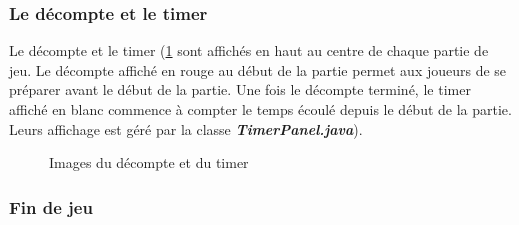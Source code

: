 \subsubsection*{Le décompte et le timer}

Le décompte et le timer (\ref{fig:CountdownAndTimer} sont affichés en haut au centre de chaque partie de jeu. Le décompte affiché en rouge au début de la partie permet aux joueurs de se préparer avant le début de la partie. Une fois le décompte terminé, le timer affiché en blanc commence à compter le temps écoulé depuis le début de la partie. Leurs affichage est géré par la classe \textbf{\textit{TimerPanel.java}}).

\begin{figure}[!htb]%
    \centering
    \qquad
    \caption{Images du décompte et du timer}%
    \label{fig:CountdownAndTimer}
\end{figure}
\FloatBarrier

\subsubsection*{Fin de jeu}

